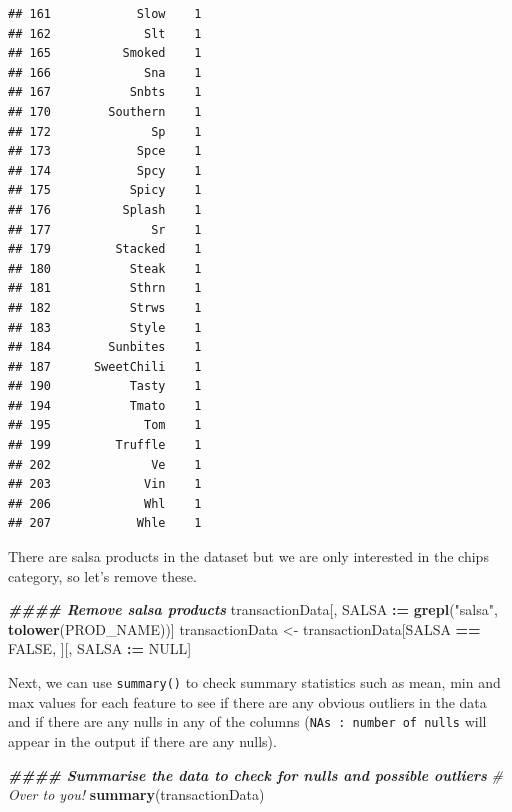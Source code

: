\documentclass[
]{article}
\newenvironment{Shaded}{\begin{snugshade}}{\end{snugshade}}
\newcommand{\CommentTok}[1]{\textcolor[rgb]{0.56,0.35,0.01}{\textit{#1}}}
\newcommand{\ConstantTok}[1]{\textcolor[rgb]{0.56,0.35,0.01}{#1}}
\newcommand{\DocumentationTok}[1]{\textcolor[rgb]{0.56,0.35,0.01}{\textbf{\textit{#1}}}}
\newcommand{\FunctionTok}[1]{\textcolor[rgb]{0.13,0.29,0.53}{\textbf{#1}}}
\newcommand{\NormalTok}[1]{#1}
\newcommand{\OtherTok}[1]{\textcolor[rgb]{0.56,0.35,0.01}{#1}}
\newcommand{\SpecialCharTok}[1]{\textcolor[rgb]{0.81,0.36,0.00}{\textbf{#1}}}
\newcommand{\StringTok}[1]{\textcolor[rgb]{0.31,0.60,0.02}{#1}}
\begin{document}
\begin{verbatim}
## 161            Slow    1
## 162             Slt    1
## 165          Smoked    1
## 166             Sna    1
## 167           Snbts    1
## 170        Southern    1
## 172              Sp    1
## 173            Spce    1
## 174            Spcy    1
## 175           Spicy    1
## 176          Splash    1
## 177              Sr    1
## 179         Stacked    1
## 180           Steak    1
## 181           Sthrn    1
## 182           Strws    1
## 183           Style    1
## 184        Sunbites    1
## 187      SweetChili    1
## 190           Tasty    1
## 194           Tmato    1
## 195             Tom    1
## 199         Truffle    1
## 202              Ve    1
## 203             Vin    1
## 206             Whl    1
## 207            Whle    1
\end{verbatim}

There are salsa products in the dataset but we are only interested in
the chips category, so let's remove these.

\begin{Shaded}
\begin{Highlighting}[]
\DocumentationTok{\#\#\#\# Remove salsa products}
\NormalTok{transactionData[, SALSA }\SpecialCharTok{:=} \FunctionTok{grepl}\NormalTok{(}\StringTok{"salsa"}\NormalTok{, }\FunctionTok{tolower}\NormalTok{(PROD\_NAME))]}
\NormalTok{transactionData }\OtherTok{\textless{}{-}}\NormalTok{ transactionData[SALSA }\SpecialCharTok{==} \ConstantTok{FALSE}\NormalTok{, ][, SALSA }\SpecialCharTok{:=} \ConstantTok{NULL}\NormalTok{]}
\end{Highlighting}
\end{Shaded}

Next, we can use \texttt{summary()} to check summary statistics such as
mean, min and max values for each feature to see if there are any
obvious outliers in the data and if there are any nulls in any of the
columns (\texttt{NA\textquotesingle{}s\ :\ number\ of\ nulls} will
appear in the output if there are any nulls).

\begin{Shaded}
\begin{Highlighting}[]
\DocumentationTok{\#\#\#\# Summarise the data to check for nulls and possible outliers}
\CommentTok{\# Over to you!}
\FunctionTok{summary}\NormalTok{(transactionData)}
\end{Highlighting}
\end{Shaded}
\end{document}
